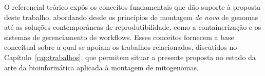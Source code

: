 O referencial teórico expôs os conceitos fundamentais que dão suporte à proposta deste trabalho, abordando desde os princípios de montagem \textit{de novo} de genomas até as soluções contemporâneas de reprodutibilidade, como a containerização e os sistemas de gerenciamento de workflows. Esses conceitos fornecem a base conceitual sobre a qual se apoiam os trabalhos relacionados, discutidos no Capítulo~\ref{cap:trabalhos}, que permitem situar a presente proposta no estado da arte da bioinformática aplicada à montagem de mitogenomas.
